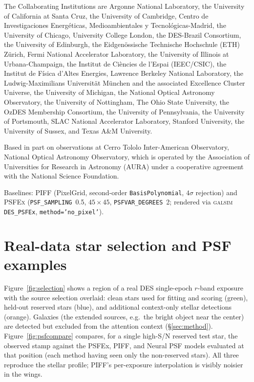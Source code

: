 \documentclass[twocolumn]{aastex701}
\begin{document}
\begin{acknowledgments}
The Collaborating Institutions are Argonne National Laboratory, the University of California at Santa Cruz, the University of Cambridge, Centro de Investigaciones Energ{\'e}ticas, Medioambientales y Tecnol{\'o}gicas-Madrid, the University of Chicago, University College London, the DES-Brazil Consortium, the University of Edinburgh, the Eidgen{\"o}ssische Technische Hochschule (ETH) Z{\"u}rich,  Fermi National Accelerator Laboratory, the University of Illinois at Urbana-Champaign, the Institut de Ci{\`e}ncies de l'Espai (IEEC/CSIC), the Institut de F{\'i}sica d'Altes Energies, Lawrence Berkeley National Laboratory, the Ludwig-Maximilians Universit{\"a}t M{\"u}nchen and the associated Excellence Cluster Universe, the University of Michigan, the National Optical Astronomy Observatory, the University of Nottingham, The Ohio State University, the OzDES Membership Consortium, the University of Pennsylvania, the University of Portsmouth, SLAC National Accelerator Laboratory, Stanford University, the University of Sussex, and Texas A\&M University.

Based in part on observations at Cerro Tololo Inter-American Observatory, National Optical Astronomy Observatory, which is operated by the Association of Universities for Research in Astronomy (AURA) under a cooperative agreement with the National Science Foundation.


Baselines: \textsc{PIFF} (PixelGrid,
second-order \texttt{BasisPolynomial}, $4\sigma$ rejection) and \textsc{PSFEx}
(\texttt{PSF\_SAMPLING}~0.5, $45\times45$, \texttt{PSFVAR\_DEGREES}~2; rendered via
\textsc{galsim} \texttt{DES\_PSFEx}, \texttt{method='no\_pixel'}).
\end{acknowledgments}



\appendix

\section{Real-data star selection and PSF examples}\label{app:examples}

Figure~\ref{fig:selection} shows a region of a real DES single-epoch $r$-band exposure
with the source selection overlaid: clean stars used for fitting and scoring (green),
held-out reserved stars (blue), and additional context-only stellar detections (orange).
Galaxies (the extended sources, e.g.\ the bright object near the center) are detected but
excluded from the attention context (\S\ref{sec:method}).
Figure~\ref{fig:psfcompare} compares, for a single high-S/N reserved test star, the
observed stamp against the PSFEx, PIFF, and Neural PSF models evaluated at that position
(each method having seen only the non-reserved stars). All three reproduce the stellar
profile; PIFF's per-exposure interpolation is visibly noisier in the wings.
\end{document}
